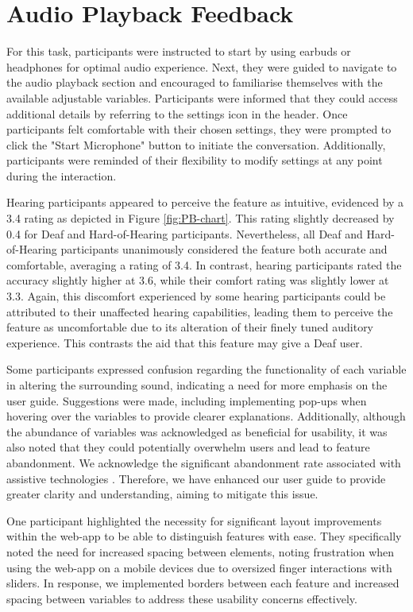 \documentclass{l4proj}
\begin{document}
\section{Audio Playback Feedback}

For this task, participants were instructed to start by using earbuds or headphones for optimal audio experience. Next, they were guided to navigate to the audio playback section and encouraged to familiarise themselves with the available adjustable variables. Participants were informed that they could access additional details by referring to the settings icon in the header. Once participants felt comfortable with their chosen settings, they were prompted to click the "Start Microphone" button to initiate the conversation. Additionally, participants were reminded of their flexibility to modify settings at any point during the interaction.

Hearing participants appeared to perceive the feature as intuitive, evidenced by a 3.4 rating as depicted in Figure \ref{fig:PB-chart}. This rating slightly decreased by 0.4 for Deaf and Hard-of-Hearing participants. Nevertheless, all Deaf and Hard-of-Hearing participants unanimously considered the feature both accurate and comfortable, averaging a rating of 3.4. In contrast, hearing participants rated the accuracy slightly higher at 3.6, while their comfort rating was slightly lower at 3.3. Again, this discomfort experienced by some hearing participants could be attributed to their unaffected hearing capabilities, leading them to perceive the feature as uncomfortable due to its alteration of their finely tuned auditory experience. This contrasts the aid that this feature may give a Deaf user. 

Some participants expressed confusion regarding the functionality of each variable in altering the surrounding sound, indicating a need for more emphasis on the user guide. Suggestions were made, including implementing pop-ups when hovering over the variables to provide clearer explanations. Additionally, although the abundance of variables was acknowledged as beneficial for usability, it was also noted that they could potentially overwhelm users and lead to feature abandonment. We acknowledge the significant abandonment rate associated with assistive technologies \citep{ijerph18147259}. Therefore, we have enhanced our user guide to provide greater clarity and understanding, aiming to mitigate this issue.

One participant highlighted the necessity for significant layout improvements within the web-app to be able to distinguish features with ease. They specifically noted the need for increased spacing between elements, noting frustration when using the web-app on a mobile devices due to oversized finger interactions with sliders. In response, we implemented borders between each feature and increased spacing between variables to address these usability concerns effectively.
\end{document}
